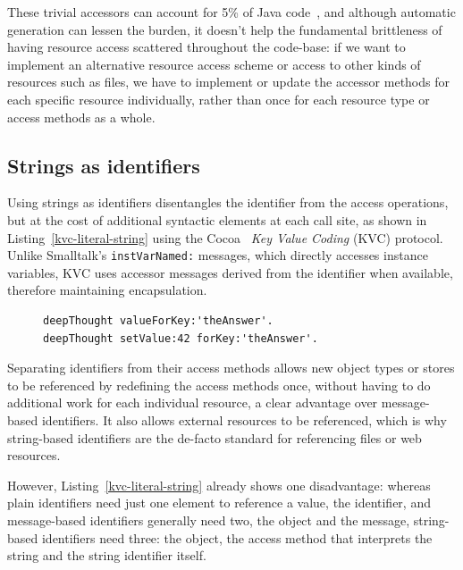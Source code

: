 \documentclass[preprint]{sigplanconf}
\begin{document}
These trivial accessors can account for 5\% of Java code~\cite{Spinellis:2002:MPC:510857.510868}, and although 
automatic generation can lessen the burden, it doesn't help the fundamental brittleness of 
having resource access scattered throughout the code-base: if we want to implement an alternative resource access scheme or 
access to other kinds of resources such as files, we  have to implement or update the accessor methods for each specific resource individually,
rather than once for each resource type or access methods as a whole.  


\subsection{Strings as identifiers}
\label{string-identifiers}
Using strings as identifiers disentangles the identifier from the access operations, but at the cost
of additional syntactic elements at each call site, as shown in Listing~\ref{kvc-literal-string} using the Cocoa~\cite{Garfinkel:2002:BCA:560771}
\emph{Key Value Coding} (KVC)
 protocol.   Unlike Smalltalk's {\tt instVarNamed:} 
messages, which directly accesses instance variables, KVC uses accessor messages derived
from the identifier when available, therefore maintaining encapsulation.

\begin{figure}[htbp]
\begin{lstlisting}[style=numbers,label=kvc-literal-string,caption=Retrieve and store value via string identifier.]
deepThought valueForKey:'theAnswer'.
deepThought setValue:42 forKey:'theAnswer'.
\end{lstlisting}
\end{figure}

Separating identifiers from their access methods allows new object types or stores to be referenced by redefining
the access methods once, without having to do additional work for each individual resource, a clear advantage
over message-based identifiers.  It also allows external resources to be referenced, which is why string-based
identifiers are the de-facto standard for referencing files or web resources.

 However, Listing~\ref{kvc-literal-string} already shows one disadvantage:  whereas
plain identifiers need just one element to reference a value, the identifier, and message-based identifiers generally need two,
the object and the message, string-based identifiers need three:  the object, the access method that interprets the
string and the string identifier itself.
\end{document}
